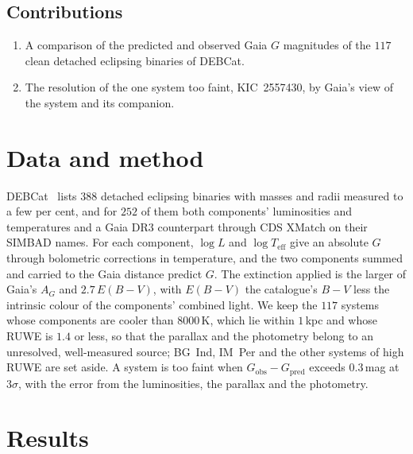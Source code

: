 \documentclass[3p,11pt]{elsarticle}
\begin{document}
\subsection{Contributions}
\begin{enumerate}[leftmargin=*,itemsep=1pt]
\item A comparison of the predicted and observed Gaia $G$ magnitudes of the $117$ clean
detached eclipsing binaries of DEBCat.
\item The resolution of the one system too faint, KIC~2557430, by Gaia's view of the
system and its companion.
\end{enumerate}

\section{Data and method}\label{sec:method}

DEBCat~\cite{Southworth2015} lists $388$ detached eclipsing binaries with masses and
radii measured to a few per cent, and for $252$ of them both components' luminosities
and temperatures and a Gaia DR3 counterpart through CDS XMatch on their SIMBAD names.
For each component, $\log L$ and $\log T_\mathrm{eff}$ give an absolute $G$ through
bolometric corrections in temperature, and the two components summed and carried to
the Gaia distance predict $G$. The extinction applied is the larger of Gaia's $A_G$ and
$2.7\,E(B-V)$, with $E(B-V)$ the catalogue's $B-V$ less the intrinsic colour of the
components' combined light. We keep the $117$ systems whose components are cooler than
$8000$\,K, which lie within $1$\,kpc and whose RUWE is $1.4$ or less, so that the
parallax and the photometry belong to an unresolved, well-measured source; BG~Ind,
IM~Per and the other systems of high RUWE are set aside. A system is too faint when
$G_\mathrm{obs}-G_\mathrm{pred}$ exceeds $0.3$\,mag at $3\sigma$, with the error from
the luminosities, the parallax and the photometry.

\section{Results}\label{sec:results}
\end{document}
